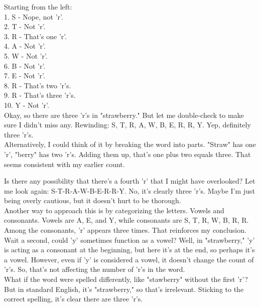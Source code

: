 \begin{abox}

Starting from the left:\\
1. S - Nope, not 'r'.\\
2. T - Not 'r'.\\
3. R - That's one 'r'.\\
4. A - Not 'r'.\\
5. W - Not 'r'.\\
6. B - Not 'r'.\\
7. E - Not 'r'.\\
8. R - That's two 'r's.\\
9. R - That's three 'r's.\\
10. Y - Not 'r'.\\

Okay, so there are three 'r's in "strawberry." But let me double-check to make sure I didn't miss any. Rewinding: S, T, R, A, W, B, E, R, R, Y. Yep, definitely three 'r's.\\

Alternatively, I could think of it by breaking the word into parts. "Straw" has one 'r', "berry" has two 'r's. Adding them up, that's one plus two equals three. That seems consistent with my earlier count.

Is there any possibility that there's a fourth 'r' that I might have overlooked? Let me look again: S-T-R-A-W-B-E-R-R-Y. No, it's clearly three 'r's. Maybe I'm just being overly cautious, but it doesn't hurt to be thorough.\\

Another way to approach this is by categorizing the letters. Vowels and consonants. Vowels are A, E, and Y, while consonants are S, T, R, W, B, R, R. Among the consonants, 'r' appears three times. That reinforces my conclusion.\\

Wait a second, could 'y' sometimes function as a vowel? Well, in "strawberry," 'y' is acting as a consonant at the beginning, but here it's at the end, so perhaps it's a vowel. However, even if 'y' is considered a vowel, it doesn't change the count of 'r's. So, that's not affecting the number of 'r's in the word.\\

What if the word were spelled differently, like "stawberry" without the first 'r'? But in standard English, it's "strawberry," so that's irrelevant. Sticking to the correct spelling, it's clear there are three 'r's.\\

\end{abox}

